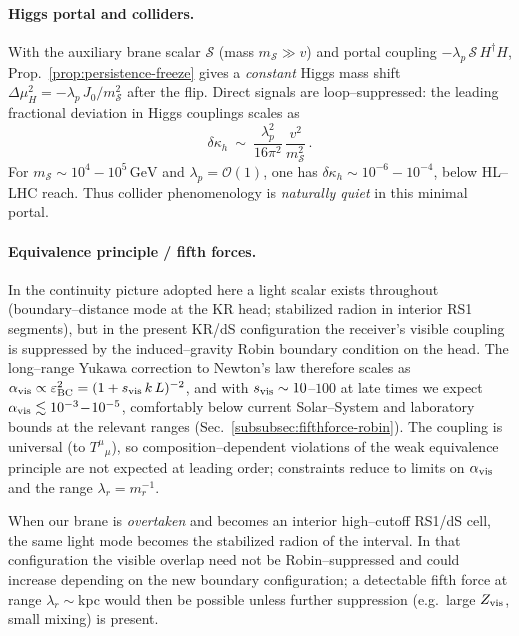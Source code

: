 \documentclass[10pt]{article}
\theoremstyle{definition}
\theoremstyle{plain}
\begin{document}
\paragraph{Higgs portal and colliders.}\label{par:uom-main-168}
With the auxiliary brane scalar \(\mathcal S\) (mass \(m_{\mathcal S}\gg v\)) and portal coupling
\(-\lambda_p\,\mathcal S\,H^\dagger H\),
Prop.~\ref{prop:persistence-freeze} gives a \emph{constant} Higgs mass shift
\(\Delta\mu_H^2=-\lambda_p\,J_0/m_{\mathcal S}^2\) after the flip. Direct signals are loop–suppressed:
the leading fractional deviation in Higgs couplings scales as
\[
\delta\kappa_h\ \sim\ \frac{\lambda_p^2}{16\pi^2}\,\frac{v^2}{m_{\mathcal S}^2}\,.
\]
For \(m_{\mathcal S}\sim 10^{4}\!-\!10^{5}\,\mathrm{GeV}\) and \(\lambda_p=\mathcal O(1)\), one has
\(\delta\kappa_h\sim 10^{-6}\!-\!10^{-4}\), below HL–LHC reach. Thus collider phenomenology is
\emph{naturally quiet} in this minimal portal.

\paragraph{Equivalence principle / fifth forces.}\label{par:uom-main-169}
In the continuity picture adopted here a light scalar exists throughout (boundary--distance mode at the
KR head; stabilized radion in interior RS1 segments), but in the present KR/dS configuration the receiver’s
visible coupling is suppressed by the induced--gravity Robin boundary condition on the head. The
long--range Yukawa correction to Newton’s law therefore scales as
\(
\alpha_{\rm vis}\propto \varepsilon_{\rm BC}^2=(1+s_{\rm vis}\,k\,L)^{-2}
\),
and with $s_{\rm vis}\sim 10$–$100$ at late times we expect
\(
\alpha_{\rm vis}\lesssim 10^{-3}\!-\!10^{-5}
\),
comfortably below current Solar–System and laboratory bounds at the relevant ranges (Sec.~\ref{subsubsec:fifthforce-robin}). The coupling is universal (to $T^\mu{}_\mu$), so composition–dependent violations of the weak equivalence principle are not expected at leading order; constraints reduce to limits on $\alpha_{\rm vis}$ and the range $\lambda_r=m_r^{-1}$.

When our brane is \emph{overtaken} and becomes an interior high–cutoff RS1/dS cell, the same light mode becomes the stabilized radion of the interval. In that configuration the visible overlap need not be Robin–suppressed and could increase depending on the new boundary configuration; a detectable fifth force at range $\lambda_r\sim$kpc would then be possible unless further suppression (e.g.\ large $Z_{\rm vis}$, small mixing) is present.
\end{document}
